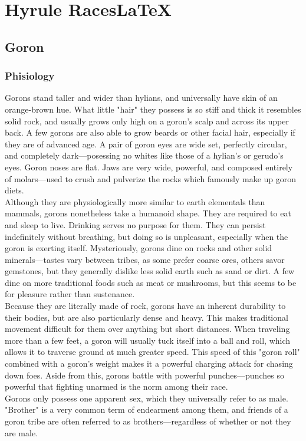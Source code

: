 \documentclass[10pt,twoside,twocolumn,openany]{book}
\begin{document}
\selectfont %


\chapter{Hyrule Races\LaTeX}

\section{Goron}

\subsection{Phisiology}
Gorons stand taller and wider than hylians, and universally have skin of an orange-brown hue. What little "hair" they possess is so stiff and thick it resembles solid rock, and usually grows only high on a goron's scalp and across its upper back. A few gorons are also able to grow beards or other facial hair, especially if they are of advanced age. A pair of goron eyes are wide set, perfectly circular, and completely dark—posessing no whites like those of a hylian's or gerudo's eyes. Goron noses are flat. Jaws are very wide, powerful, and composed entirely of molars—used to crush and pulverize the rocks which famously make up goron diets.\\
Although they are physiologically more similar to earth elementals than mammals, gorons nonetheless take a humanoid shape. They are required to eat and sleep to live. Drinking serves no purpose for them. They can persist indefinitely without breathing, but doing so is unpleasant, especially when the goron is exerting itself. Mysteriously, gorons dine on rocks and other solid minerals—tastes vary between tribes, as some prefer coarse ores, others savor gemstones, but they generally dislike less solid earth such as sand or dirt. A few dine on more traditional foods such as meat or mushrooms, but this seems to be for pleasure rather than sustenance.\\
Because they are literally made of rock, gorons have an inherent durability to their bodies, but are also particularly dense and heavy. This makes traditional movement difficult for them over anything but short distances. When traveling more than a few feet, a goron will usually tuck itself into a ball and roll, which allows it to traverse ground at much greater speed. This speed of this "goron roll" combined with a goron's weight makes it a powerful charging attack for chasing down foes. Aside from this, gorons battle with powerful punches—punches so powerful that fighting unarmed is the norm among their race.\\
Gorons only possess one apparent sex, which they universally refer to as male. "Brother" is a very common term of endearment among them, and friends of a goron tribe are often referred to as brothers—regardless of whether or not they are male.\\
\end{document}
